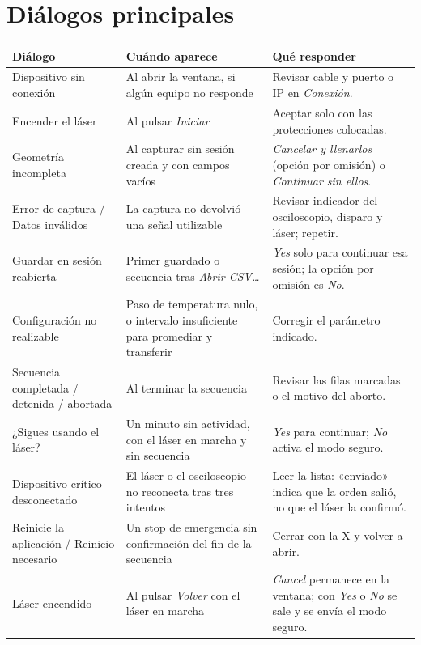 \section*{Diálogos principales}

\noindent\begin{minipage}{\textwidth}
  \centering
  \footnotesize
  \label{tab:dialogos_manual}
  \renewcommand{\arraystretch}{1.05}
  \noindent\begin{tabularx}{\textwidth}{>{\raggedright\arraybackslash}p{}
      >{\raggedright\arraybackslash}p{}
      >{\raggedright\arraybackslash}X}
    \toprule
    \textbf{Diálogo} & \textbf{Cuándo aparece} & \textbf{Qué responder}\\
    \midrule
    Dispositivo sin conexión & Al abrir la ventana, si algún equipo no
      responde & Revisar cable y puerto o IP en \emph{Conexión}.\\
    Encender el láser & Al pulsar \emph{Iniciar} & Aceptar solo con las
      protecciones colocadas.\\
    Geometría incompleta & Al capturar sin sesión creada y con campos
      vacíos & \emph{Cancelar y llenarlos} (opción por omisión) o
      \emph{Continuar sin ellos}.\\
    Error de captura / Datos inválidos & La captura no devolvió una
      señal utilizable & Revisar indicador del osciloscopio, disparo y
      láser; repetir.\\
    Guardar en sesión reabierta & Primer guardado o secuencia tras
      \emph{Abrir CSV\ldots} & \emph{Yes} solo para continuar esa
      sesión; la opción por omisión es \emph{No}.\\
    Configuración no realizable & Paso de temperatura nulo, o intervalo
      insuficiente para promediar y transferir & Corregir el parámetro
      indicado.\\
    Secuencia completada / detenida / abortada & Al terminar la
      secuencia & Revisar las filas marcadas o el motivo del aborto.\\
    ¿Sigues usando el láser? & Un minuto sin actividad, con el láser en
      marcha y sin secuencia & \emph{Yes} para continuar; \emph{No}
      activa el modo seguro.\\
    Dispositivo crítico desconectado & El láser o el osciloscopio
      no reconecta tras tres intentos & Leer la lista: «enviado» indica que la orden salió,
      no que el láser la confirmó.\\
    Reinicie la aplicación / Reinicio necesario & Un stop de emergencia
      sin confirmación del fin de la secuencia & Cerrar con la X y
      volver a abrir.\\
    Láser encendido & Al pulsar \emph{Volver} con el láser en marcha &
      \emph{Cancel} permanece en la ventana; con \emph{Yes} o \emph{No}
      se sale y se envía el modo seguro.\\
    \bottomrule
  \end{tabularx}
\end{minipage}
